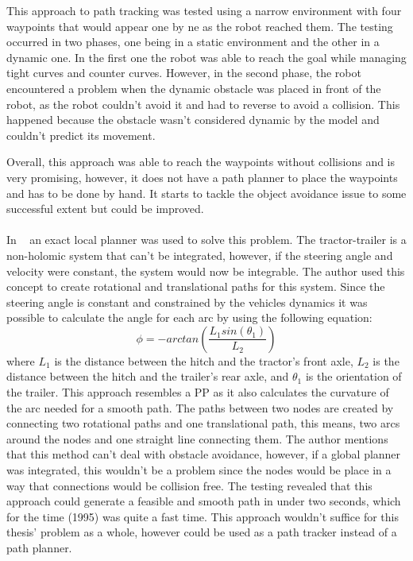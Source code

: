 This approach to path tracking was tested using a narrow environment with four waypoints that would 
appear one by ne as the robot reached them. The testing occurred in two phases, one being in a static 
environment and the other in a dynamic one. In the first one the robot was able to reach the 
goal while managing tight curves and counter curves. However, in the second phase, the robot 
encountered a problem when the dynamic obstacle was placed in front of the robot, as the robot couldn't 
avoid it and had to reverse to avoid a collision. This happened because the obstacle wasn't considered 
dynamic by the model and couldn't predict its movement.

Overall, this approach was able to reach the waypoints without collisions and is very promising, however, 
it does not have a path planner to place the waypoints and has to be done by hand. It starts to 
tackle the object avoidance issue to some successful extent but could be improved.

\paragraph{} In ~\cite{ttex3} an exact local planner was used to solve this problem. The tractor-trailer is a 
non-holomic system that can't be integrated, however, if the steering angle and velocity were constant, 
the system would now be integrable. The author used this concept to create rotational and translational 
paths for this system. Since the steering angle is constant and constrained by the vehicles dynamics 
it was possible to calculate the angle for each arc by using the following equation:
\begin{equation}
    \phi = -arctan(\frac{L_1sin(\theta_1)}{L_2})
\end{equation}
where $L_1$ is the distance between the hitch and the tractor's front axle, $L_2$ is the distance between the 
hitch and the trailer's rear axle, and $\theta_1$ is the orientation of the trailer. This approach 
resembles a \gls{PP} as it also calculates the curvature of the arc needed for a smooth 
path. The paths between two nodes are created by connecting two rotational paths and one translational path, this means, two arcs around 
the nodes and one straight line connecting them. The author mentions that this method can't deal 
with obstacle avoidance, however, if a global planner was integrated, this wouldn't be 
a problem since the nodes would be place in a way that connections would be collision free. 
The testing revealed that this approach could generate a feasible and smooth path in under two seconds, 
which for the time (1995) was quite a fast time. This approach wouldn't suffice for this thesis' 
problem as a whole, however could be used as a path tracker instead of a path planner.

